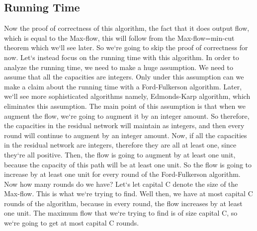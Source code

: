 \subsection{Running Time}
Now the proof of correctness of this algorithm, the fact that it does output flow, which is equal to the Max-flow, this will follow from the Max-flow=min-cut theorem which we`ll see later.
So we`re going to skip the proof of correctness for now.
Let`s instead focus on the running time with this algorithm.
In order to analyze the running time, we need to make a huge assumption.
We need to assume that all the capacities are integers.
Only under this assumption can we make a claim about the running time with a Ford-Fulkerson algorithm.
Later, we`ll see more sophisticated algorithms namely, Edmonds-Karp algorithm, which eliminates this assumption.
The main point of this assumption is that when we augment the flow, we`re going to augment it by an integer amount.
So therefore, the capacities in the residual network will maintain as integers, and then every round will continue to augment by an integer amount.
Now, if all the capacities in the residual network are integers, therefore they are all at least one, since they`re all positive.
Then, the flow is going to augment by at least one unit, because the capacity of this path will be at least one unit.
So the flow is going to increase by at least one unit for every round of the Ford-Fulkerson algorithm.
Now how many rounds do we have? Let`s let capital C denote the size of the Max-flow.
This is what we`re trying to find.
Well then, we have at most capital C rounds of the algorithm, because in every round, the flow increases by at least one unit.
The maximum flow that we`re trying to find is of size capital C, so we`re going to get at most capital C rounds.

